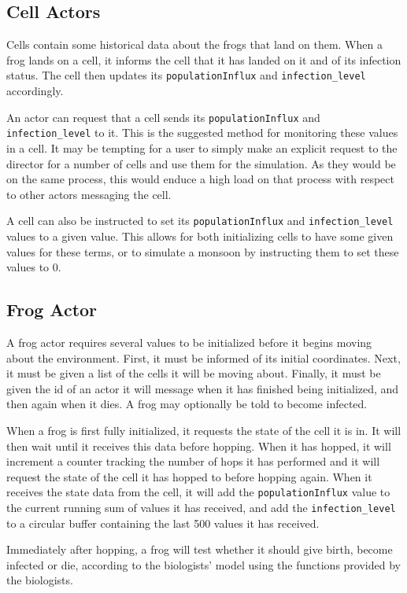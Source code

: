 \documentclass[12pt,a4paper]{article}
\newcommand{\term}[1]{\texttt{#1}}
\begin{document}
\subsection{Cell Actors}
Cells contain some historical data about the frogs that land on them.
When a frog lands on a cell, it informs the cell that it has landed
on it and of its infection status.
The cell then updates its \term{populationInflux} and
\term{infection\_level} accordingly.

An actor can request that a cell sends its \term{populationInflux} and
\term{infection\_level} to it.
This is the suggested method for monitoring these values in a cell.
It may be tempting for a user to simply make an explicit request
to the director for a number of cells and use them for the simulation.
As they would be on the same process, this would enduce a high
load on that process with respect to other actors messaging the
cell.

A cell can also be instructed to set its \term{populationInflux} and
\term{infection\_level} values to a given value.
This allows for both initializing cells to have some given values
for these terms, or to simulate a monsoon by instructing them to set
these values to 0.

\subsection{Frog Actor}
A frog actor requires several values to be initialized before it
begins moving about the environment.
First, it must be informed of its initial coordinates.
Next, it must be given a list of the cells it will be moving about.
Finally, it must be given the id of an actor it will message when
it has finished being initialized, and then again when it dies.
A frog may optionally be told to become infected.

When a frog is first fully initialized, it requests the state of the cell
it is in.
It will then wait until it receives this data before hopping.
When it has hopped, it will increment a counter tracking the number
of hops it has performed and it will
request the state of the cell it has hopped to before hopping again.
When it receives the state data from the cell, it will add the
\term{populationInflux} value to the current running sum of values
it has received, and add the \term{infection\_level} to a circular
buffer containing the last 500 values it has received.

Immediately after hopping, a frog will test whether it should give
birth, become infected or die, according to the biologists' model
using the functions provided by the biologists.
\end{document}
